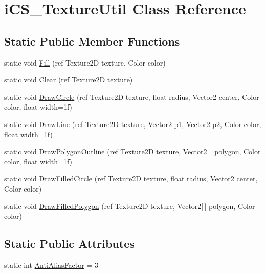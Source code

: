\hypertarget{classi_c_s___texture_util}{\section{i\+C\+S\+\_\+\+Texture\+Util Class Reference}
\label{classi_c_s___texture_util}
}
\subsection*{Static Public Member Functions}
\begin{DoxyCompactItemize}
\item 
static void \hyperlink{classi_c_s___texture_util_a93e4c3f42179a00cb9cdbe1d3f709ac5}{Fill} (ref Texture2\+D texture, Color color)
\item 
static void \hyperlink{classi_c_s___texture_util_a8b48a741b391509af18fd662a5f136ff}{Clear} (ref Texture2\+D texture)
\item 
static void \hyperlink{classi_c_s___texture_util_ac992713768c7ac9a9a226f13c063eca4}{Draw\+Circle} (ref Texture2\+D texture, float radius, Vector2 center, Color color, float width=1f)
\item 
static void \hyperlink{classi_c_s___texture_util_af580ce7a2cfbea683419eff1b2409279}{Draw\+Line} (ref Texture2\+D texture, Vector2 p1, Vector2 p2, Color color, float width=1f)
\item 
static void \hyperlink{classi_c_s___texture_util_ae8e3e847e3e2865caf4c135018842471}{Draw\+Polygon\+Outline} (ref Texture2\+D texture, Vector2\mbox{[}$\,$\mbox{]} polygon, Color color, float width=1f)
\item 
static void \hyperlink{classi_c_s___texture_util_a3ceeadaf288743944088a872c8f955e3}{Draw\+Filled\+Circle} (ref Texture2\+D texture, float radius, Vector2 center, Color color)
\item 
static void \hyperlink{classi_c_s___texture_util_aeddfc8115a8c1f2c81d78847b1a04ac0}{Draw\+Filled\+Polygon} (ref Texture2\+D texture, Vector2\mbox{[}$\,$\mbox{]} polygon, Color color)
\end{DoxyCompactItemize}
\subsection*{Static Public Attributes}
\begin{DoxyCompactItemize}
\item 
static int \hyperlink{classi_c_s___texture_util_adddeb844fd48474199242ea25c90a34e}{Anti\+Alias\+Factor} = 3
\end{DoxyCompactItemize}



